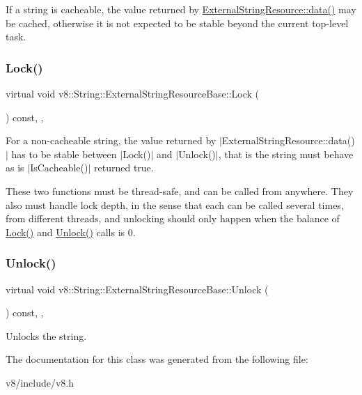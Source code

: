 If a string is cacheable, the value returned by \mbox{\hyperlink{classv8_1_1String_1_1ExternalStringResource_a987309199b848511adb708e221e0fb0a}{External\+String\+Resource\+::data()}} may be cached, otherwise it is not expected to be stable beyond the current top-\/level task. \mbox{\label{classv8_1_1String_1_1ExternalStringResourceBase_ae539b974907cc2737e58797ace2652b4}} 
\subsubsection{\texorpdfstring{Lock()}{Lock()}}
{\footnotesize\ttfamily virtual void v8\+::\+String\+::\+External\+String\+Resource\+Base\+::\+Lock (\begin{DoxyParamCaption}{ }\end{DoxyParamCaption}) const\hspace{0.3cm}{\ttfamily [inline]}, {\ttfamily [protected]}, {\ttfamily [virtual]}}

For a non-\/cacheable string, the value returned by $\vert$\+External\+String\+Resource\+::data()$\vert$ has to be stable between $\vert$\+Lock()$\vert$ and $\vert$\+Unlock()$\vert$, that is the string must behave as is $\vert$\+Is\+Cacheable()$\vert$ returned true.

These two functions must be thread-\/safe, and can be called from anywhere. They also must handle lock depth, in the sense that each can be called several times, from different threads, and unlocking should only happen when the balance of \mbox{\hyperlink{classv8_1_1String_1_1ExternalStringResourceBase_ae539b974907cc2737e58797ace2652b4}{Lock()}} and \mbox{\hyperlink{classv8_1_1String_1_1ExternalStringResourceBase_a6c6892d46c8fafaa938df542a6e334cd}{Unlock()}} calls is 0. \mbox{\label{classv8_1_1String_1_1ExternalStringResourceBase_a6c6892d46c8fafaa938df542a6e334cd}} 
\subsubsection{\texorpdfstring{Unlock()}{Unlock()}}
{\footnotesize\ttfamily virtual void v8\+::\+String\+::\+External\+String\+Resource\+Base\+::\+Unlock (\begin{DoxyParamCaption}{ }\end{DoxyParamCaption}) const\hspace{0.3cm}{\ttfamily [inline]}, {\ttfamily [protected]}, {\ttfamily [virtual]}}

Unlocks the string. 

The documentation for this class was generated from the following file\+:\begin{DoxyCompactItemize}
\item 
v8/include/v8.\+h\end{DoxyCompactItemize}
